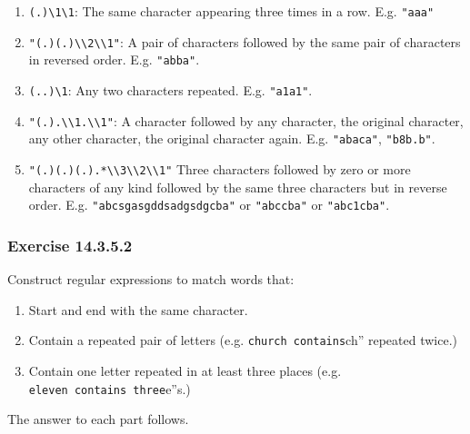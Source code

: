 \documentclass[]{book}
\providecommand{\tightlist}{%
  \setlength{\itemsep}{0pt}\setlength{\parskip}{0pt}}
\theoremstyle{plain}
\theoremstyle{remark}
\theoremstyle{definition}
\theoremstyle{definition}
\theoremstyle{definition}
\theoremstyle{remark}
\begin{document}
\begin{enumerate}
\def\labelenumi{\arabic{enumi}.}
\tightlist
\item
  \texttt{(.)\textbackslash{}1\textbackslash{}1}: The same character
  appearing three times in a row. E.g. \texttt{"aaa"}
\item
  \texttt{"(.)(.)\textbackslash{}\textbackslash{}2\textbackslash{}\textbackslash{}1"}:
  A pair of characters followed by the same pair of characters in
  reversed order. E.g. \texttt{"abba"}.
\item
  \texttt{(..)\textbackslash{}1}: Any two characters repeated. E.g.
  \texttt{"a1a1"}.
\item
  \texttt{"(.).\textbackslash{}\textbackslash{}1.\textbackslash{}\textbackslash{}1"}:
  A character followed by any character, the original character, any
  other character, the original character again. E.g. \texttt{"abaca"},
  \texttt{"b8b.b"}.
\item
  \texttt{"(.)(.)(.).*\textbackslash{}\textbackslash{}3\textbackslash{}\textbackslash{}2\textbackslash{}\textbackslash{}1"}
  Three characters followed by zero or more characters of any kind
  followed by the same three characters but in reverse order. E.g.
  \texttt{"abcsgasgddsadgsdgcba"} or \texttt{"abccba"} or
  \texttt{"abc1cba"}.
\end{enumerate}

\hypertarget{exercise-14.3.5.2}{%
\subsubsection*{\texorpdfstring{Exercise
{14.3.5.2}}{Exercise 14.3.5.2}}\label{exercise-14.3.5.2}}

Construct regular expressions to match words that:

\begin{enumerate}
\def\labelenumi{\arabic{enumi}.}
\tightlist
\item
  Start and end with the same character.
\item
  Contain a repeated pair of letters (e.g.
  \texttt{church\textquotesingle{}\textquotesingle{}\ contains}ch''
  repeated twice.)
\item
  Contain one letter repeated in at least three places (e.g.
  \texttt{eleven\textquotesingle{}\textquotesingle{}\ contains\ three}e''s.)
\end{enumerate}

The answer to each part follows.
\end{document}
